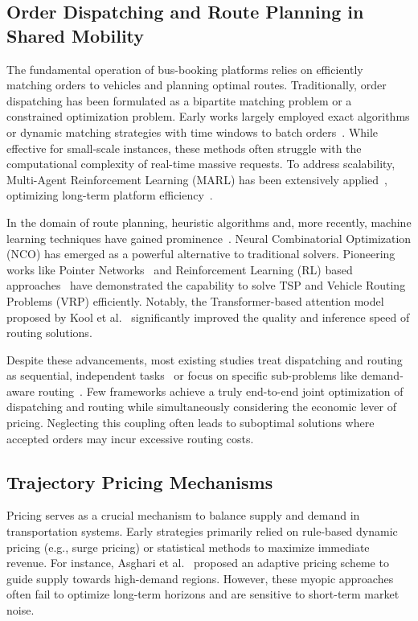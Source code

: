 \documentclass[lettersize,journal]{IEEEtran}
\begin{document}
\subsection{Order Dispatching and Route Planning in Shared Mobility} The fundamental operation of bus-booking platforms relies on efficiently matching orders to vehicles and planning optimal routes. Traditionally, order dispatching has been formulated as a bipartite matching problem or a constrained optimization problem. Early works largely employed exact algorithms or dynamic matching strategies with time windows to batch orders~\cite{ref:dm}. While effective for small-scale instances, these methods often struggle with the computational complexity of real-time massive requests. To address scalability, Multi-Agent Reinforcement Learning (MARL) has been extensively applied~\cite{ref:Yang2024KDD, ref:marl}, optimizing long-term platform efficiency~\cite{ref:Sun2022KDD}.

In the domain of route planning, heuristic algorithms and, more recently, machine learning techniques have gained prominence~\cite{tkde/ZhengCS23}. Neural Combinatorial Optimization (NCO) has emerged as a powerful alternative to traditional solvers. Pioneering works like Pointer Networks~\cite{ref_ptr} and Reinforcement Learning (RL) based approaches~\cite{ref_rl, ref:PanRoute} have demonstrated the capability to solve TSP and Vehicle Routing Problems (VRP) efficiently. Notably, the Transformer-based attention model proposed by Kool et al.~\cite{ref_att} significantly improved the quality and inference speed of routing solutions.

Despite these advancements, most existing studies treat dispatching and routing as sequential, independent tasks~\cite{ref:DPEA} or focus on specific sub-problems like demand-aware routing~\cite{ref:DemandAware}. Few frameworks achieve a truly end-to-end joint optimization of dispatching and routing while simultaneously considering the economic lever of pricing. Neglecting this coupling often leads to suboptimal solutions where accepted orders may incur excessive routing costs.

\subsection{Trajectory Pricing Mechanisms} Pricing serves as a crucial mechanism to balance supply and demand in transportation systems. Early strategies primarily relied on rule-based dynamic pricing (e.g., surge pricing) or statistical methods to maximize immediate revenue. For instance, Asghari et al.~\cite{ref:PODP} proposed an adaptive pricing scheme to guide supply towards high-demand regions. However, these myopic approaches often fail to optimize long-term horizons and are sensitive to short-term market noise.
\end{document}
